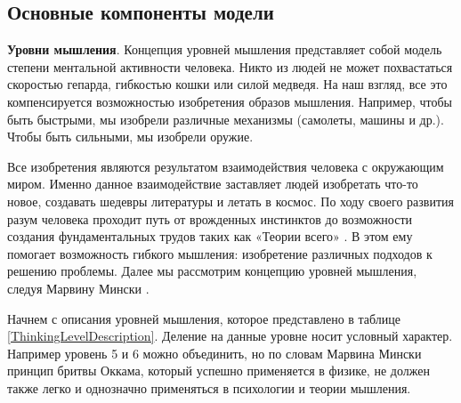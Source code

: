 \subsection{Основные компоненты модели}
\textbf{Уровни мышления}. Концепция уровней мышления представляет собой модель степени ментальной активности человека. Никто из людей не может похвастаться скоростью гепарда, гибкостью кошки или силой медведя. На наш взгляд, все это компенсируется возможностью изобретения образов мышления. Например, чтобы быть быстрыми, мы изобрели различные механизмы (самолеты, машины и др.). Чтобы быть сильными, мы изобрели оружие. \par
 Все изобретения являются результатом взаимодействия человека с окружающим миром. Именно данное взаимодействие заставляет людей изобретать что-то новое, создавать шедевры литературы и летать в космос. По ходу своего развития разум человека проходит путь от врожденных инстинктов до возможности создания фундаментальных трудов таких как  «Теории всего» \cite{Hawking}. В этом ему помогает возможность гибкого мышления: изобретение различных подходов к решению проблемы. Далее мы рассмотрим концепцию уровней мышления, следуя Марвину Мински \cite{EmotionMachine}. \par
Начнем с описания уровней мышления, которое представлено в таблице \ref{ThinkingLevelDescription}. Деление на данные уровне носит условный характер. Например уровень 5 и 6 можно объединить, но по словам Марвина Мински принцип бритвы Оккама, который успешно применяется в физике, не должен также легко и однозначно применяться в психологии и теории мышления. \par





